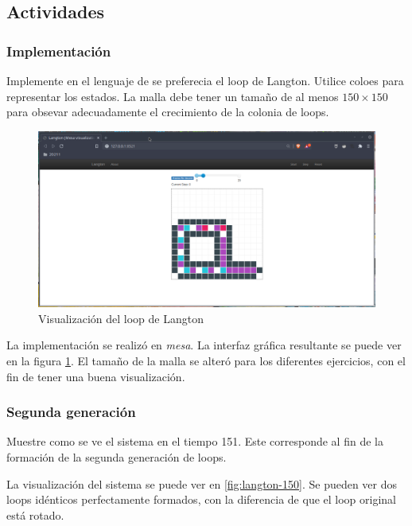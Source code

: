 \documentclass{article}
\begin{document}
\subsection{Actividades}

\subsubsection{Implementación}

Implemente en el lenguaje de se preferecia el loop de Langton. Utilice coloes
para representar los estados. La malla debe tener un tamaño de al menos
$150 \times 150$ para obsevar adecuadamente el crecimiento de la colonia de
loops.

\begin{figure}
  \centering
  \includegraphics[width=\textwidth]{imgs/lang_ui.png}
  \caption{Visualización del loop de Langton}
  \label{fig:langton-ui}
\end{figure}

La implementación se realizó en \textit{mesa}. La interfaz gráfica resultante se
puede ver en la figura \ref{fig:langton-ui}. El tamaño de la malla se alteró
para los diferentes ejercicios, con el fin de tener una buena visualización.

\subsubsection{Segunda generación}

Muestre como se ve el sistema en el tiempo 151. Este corresponde al fin de la
formación de la segunda generación de loops.

La visualización del sistema se puede ver en \ref{fig:langton-150}. Se pueden
ver dos loops idénticos perfectamente formados, con la diferencia de que el loop
original está rotado.
\end{document}
